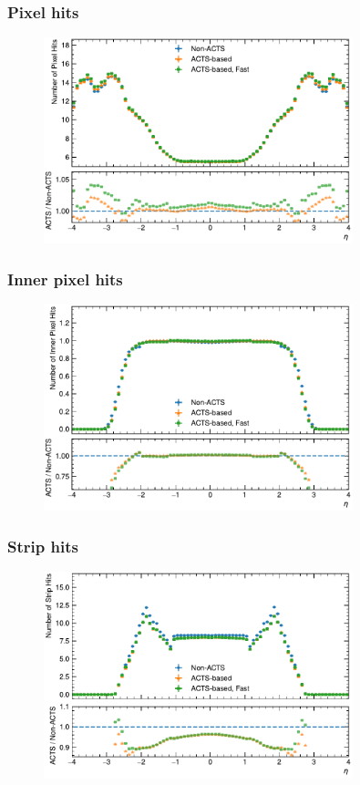 \documentclass[aspectratio=169]{beamer}
\begin{document}
\begin{frame}
\frametitle{Pixel hits}
\begin{figure}[h]
    \centering
    \includegraphics[width=0.8\textwidth]{plots/appendix/tracking_hits_pixel.pdf}
\end{figure}
\end{frame}

\begin{frame}
\frametitle{Inner pixel hits}
\begin{figure}[h]
    \centering
    \includegraphics[width=0.8\textwidth]{plots/appendix/tracking_hits_pixel_inner.pdf}
\end{figure}
\end{frame}

\begin{frame}
\frametitle{Strip hits}
\begin{figure}[h]
    \centering
    \includegraphics[width=0.8\textwidth]{plots/appendix/tracking_hits_strip.pdf}
\end{figure}
\end{frame}
\end{document}
